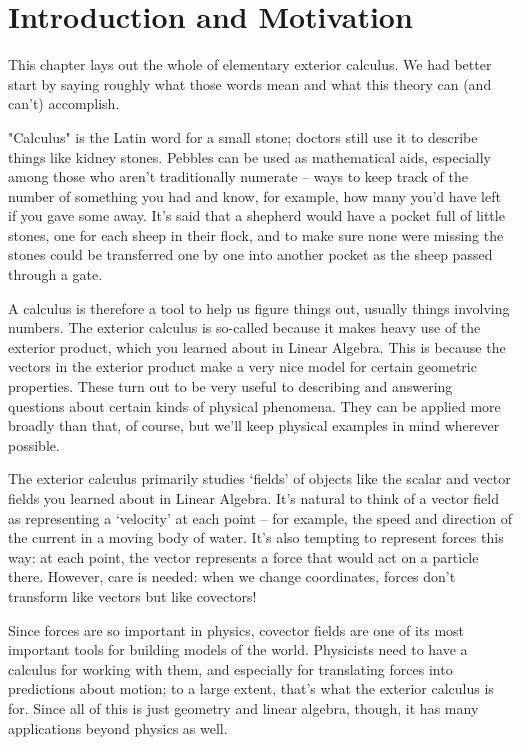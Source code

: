 \documentclass[oneside,english]{amsbook}
\numberwithin{section}{chapter}
\theoremstyle{plain}
\theoremstyle{definition}
\begin{document}
		\section{Introduction and Motivation}
		
			This chapter lays out the whole of elementary exterior calculus. We had better start by saying roughly what those words mean and what this theory can (and can't) accomplish.
			
			"Calculus" is the Latin word for a small stone; doctors still use it to describe things like kidney stones. Pebbles can be used as mathematical aids, especially among those who aren't traditionally numerate -- ways to keep track of the number of something you had and know, for example, how many you'd have left if you gave some away. It's said that a shepherd would have a pocket full of little stones, one for each sheep in their flock, and to make sure none were missing the stones could be transferred one by one into another pocket as the sheep passed through a gate.
			
			A calculus is therefore a tool to help us figure things out, usually things involving numbers. The exterior calculus is so-called because it makes heavy use of the exterior product, which you learned about in Linear Algebra. This is because the vectors in the exterior product make a very nice model for certain geometric properties. These turn out to be very useful to describing and answering questions about certain kinds of physical phenomena. They can be applied more broadly than that, of course, but we'll keep physical examples in mind wherever possible.
			
			The exterior calculus primarily studies `fields' of objects like the scalar and vector fields you learned about in Linear Algebra. It's natural to think of a vector field as representing a `velocity' at each point -- for example, the speed and direction of the current in a moving body of water. It's also tempting to represent forces this way: at each point, the vector represents a force that would act on a particle there. However, care is needed: when we change coordinates, forces don't transform like vectors but like covectors! 
			
			Since forces are so important in physics, covector fields are one of its most important tools for building models of the world. Physicists need to have a calculus for working with them, and especially for translating forces into predictions about motion; to a large extent, that's what the exterior calculus is for. Since all of this is just geometry and linear algebra, though, it has many applications beyond physics as well.
			
\end{document}

